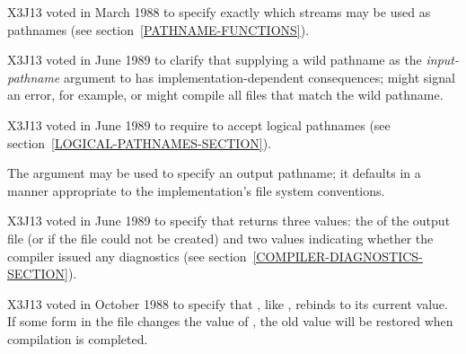 \begin{new}
X3J13 voted in March 1988
to specify exactly which streams may be used as pathnames
(see section~\ref{PATHNAME-FUNCTIONS}).
\end{new}
\begin{newer}
X3J13 voted in June 1989 
to clarify that supplying a wild pathname
as the {\it input-pathname} argument to  has implementation-dependent consequences;
 might signal an error, for example,
or might compile all files that match the wild pathname.
\end{newer}

\begin{newer}
X3J13 voted in June 1989  to require 
to accept logical pathnames (see section~\ref{LOGICAL-PATHNAMES-SECTION}).
\end{newer}

The  argument may be used to specify an output pathname;
it defaults in a manner
appropriate to the implementation's file system conventions.


\begin{newer}
X3J13 voted in June 1989  to specify that
 returns three values: the  of the output
file (or  if the file could not be created) and two values
indicating whether the compiler issued any diagnostics
(see section~\ref{COMPILER-DIAGNOSTICS-SECTION}).
\end{newer}

\begin{newer}
X3J13 voted in October 1988  to specify that
, like , rebinds  to its current value.  If
some form in the file changes the value of ,
the old value will be restored when compilation is completed.
\end{newer}


